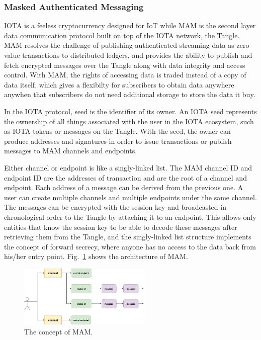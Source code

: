 \documentclass[conference]{IEEEtran}
\begin{document}
\subsubsection{Masked Authenticated Messaging}
IOTA is a feeless cryptocurrency designed for IoT while MAM is the second layer data communication protocol built on top of the IOTA network, the Tangle. MAM resolves the challenge of publishing authenticated streaming data as zero-value transactions to distributed ledgers, and provides the ability to publish and fetch encrypted messages over the Tangle along with data integrity and access control.
With MAM, the rights of accessing data is traded instead of a copy of data itself, which gives a flexibilty for subscribers to obtain data anywhere anywhen that subscribers do not need additional storage to store the data it buy.
 
In the IOTA protocol, seed is the identifier of its owner. An IOTA seed represents the ownership of all things associated with the user in the IOTA ecosystem, such as IOTA tokens or messages on the Tangle. With the seed, the owner can produce addresses and signatures in order to issue transactions or publish messages to MAM channels and endpoints.

Either channel or endpoint is like a singly-linked list. The MAM channel ID and endpoint ID are the addresses of transaction and are the root of a channel and endpoint. Each address of a message can be derived from the previous one. A user can create multiple channels and multiple endpoints under the same channel. The messages can be encrypted with the session key and broadcasted in chronological order to the Tangle by attaching it to an endpoint. This allows only entities that know the session key to be able to decode these messages after retrieving them from the Tangle, and the singly-linked list structure implements the concept of forward secrecy, where anyone has no access to the data back from his/her entry point. Fig.~\ref{fig:mam_struct} shows the architecture of MAM.

\begin{figure}[!t]
    \centering
    \includegraphics[width=2.5in]{mam_struct}
    \caption{The concept of MAM.}
    \label{fig:mam_struct}
\end{figure}
\end{document}
